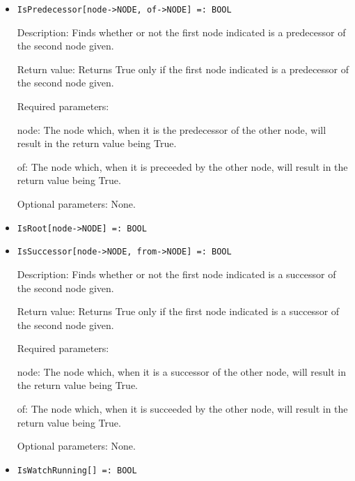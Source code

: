 \begin{itemize}
\item
\protect \large \begin{verbatim}
IsPredecessor[node->NODE, of->NODE] =: BOOL
\end{verbatim}\normalsize

\bd
\item
[Description:] Finds whether or not the first node indicated is a
predecessor of the second node given.
\item
[Return value:] Returns True only if the first node indicated is a
predecessor of the second node given.
\item
[Required parameters:]\hfil\null

\bd
\item
[node:] The node which, when it is the predecessor of the other node,
will result in the return value being True.
\item
[of:] The node which, when it is preceeded by the other node, will
result in the return value being True.
\ed

\item
[Optional parameters:] None.
\ed

\item
\protect \large \begin{verbatim}
IsRoot[node->NODE] =: BOOL
\end{verbatim}\normalsize

\item
\protect \large \begin{verbatim}
IsSuccessor[node->NODE, from->NODE] =: BOOL
\end{verbatim}\normalsize
\bd
\item
[Description:] Finds whether or not the first node indicated is a
successor of the second node given.
\item
[Return value:] Returns True only if the first node indicated is a
successor of the second node given.
\item
[Required parameters:]\hfil\null
	
\bd
\item
[node:] The node which, when it is a successor of the other node, will
result in the return value being True.
\item
[of:] The node which, when it is succeeded by the other node, will
result in the return value being True.
\ed

\item
[Optional parameters:] None.
\ed

\item
\protect \large \begin{verbatim}
IsWatchRunning[] =: BOOL
\end{verbatim}\normalsize


\end{itemize}
